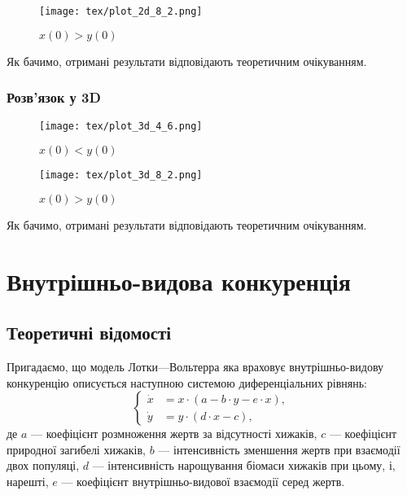 \begin{figure}[H]
	\centering
	\caption{$x(0) > y(0)$}
	\texttt{[image: tex/plot\_2d\_8\_2.png]}
\end{figure}

Як бачимо, отримані результати відповідають теоретичним очікуванням.

\newpage
	
\subsubsection{Розв'язок у 3D}

\begin{minipage}[t]{.5\textwidth}
	\begin{figure}[H]
		\centering
		\caption{$x(0) < y(0)$}
		\texttt{[image: tex/plot\_3d\_4\_6.png]}
	\end{figure}
\end{minipage}
\begin{minipage}[t]{.5\textwidth}
	\begin{figure}[H]
		\centering
		\caption{$x(0) > y(0)$}
		\texttt{[image: tex/plot\_3d\_8\_2.png]}
	\end{figure}
\end{minipage}

Як бачимо, отримані результати відповідають теоретичним очікуванням.

\section{Внутрішньо-видова конкуренція}

\subsection{Теоретичні відомості}

Пригадаємо, що модель Лотки---Вольтерра яка враховує внутрішньо-видову конкуренцію описується наступною системою диференціальних рівнянь:
\begin{equation}
	\left\{
		\begin{aligned}
			\dot x &= x \cdot (a - b \cdot y - e \cdot x), \\
			\dot y &= y \cdot (d \cdot x - c),
		\end{aligned}
	\right.
\end{equation}
де $a$ --- коефіцієнт розмноження жертв за відсутності хижаків, $c$ --- коефіцієнт природної загибелі хижаків, $b$ --- інтенсивність зменшення жертв при взаємодії двох популяці, $d$ --- інтенсивність нарощування біомаси хижаків при цьому, і, нарешті, $e$ --- коефіцієнт внутрішньо-видової взаємодії серед жертв. \medskip

